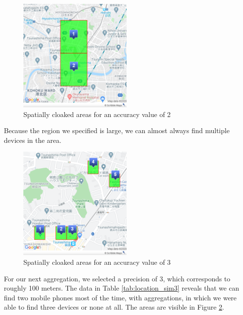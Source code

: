 \begin{figure}[htbp]
  \centering
  \includegraphics[width=0.5\textwidth]{figures/acc2}
  \caption{Spatially cloaked areas for an accuracy value of 2} \label{fig:acc2}
\end{figure}

Because the region we specified is large, we can almost always find multiple devices in the area.

\begin{figure}[htbp]
  \centering
  \includegraphics[width=0.5\textwidth]{figures/acc3}
  \caption{Spatially cloaked areas for an accuracy value of 3} \label{fig:acc3}
\end{figure}

For our next aggregation, we selected a precision of 3, which corresponds to roughly 100 meters. The data in Table \ref{tab:location_sim3} reveals that we can find two mobile phones most of the time, with aggregations, in which we were able to find three devices or none at all. The areas are visible in Figure \ref{fig:acc3}.

